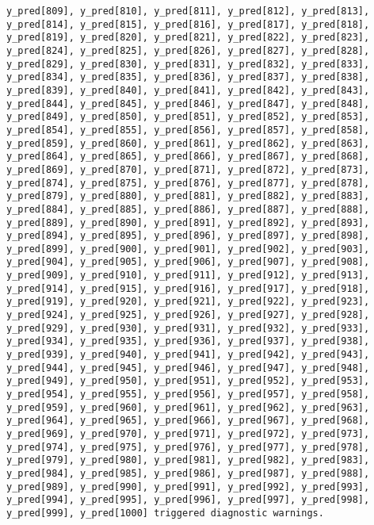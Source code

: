 \documentclass[
  letterpaper,
  DIV=11,
  numbers=noendperiod]{scrartcl}
\begin{document}
\begin{verbatim}
y_pred[809], y_pred[810], y_pred[811], y_pred[812], y_pred[813],
y_pred[814], y_pred[815], y_pred[816], y_pred[817], y_pred[818],
y_pred[819], y_pred[820], y_pred[821], y_pred[822], y_pred[823],
y_pred[824], y_pred[825], y_pred[826], y_pred[827], y_pred[828],
y_pred[829], y_pred[830], y_pred[831], y_pred[832], y_pred[833],
y_pred[834], y_pred[835], y_pred[836], y_pred[837], y_pred[838],
y_pred[839], y_pred[840], y_pred[841], y_pred[842], y_pred[843],
y_pred[844], y_pred[845], y_pred[846], y_pred[847], y_pred[848],
y_pred[849], y_pred[850], y_pred[851], y_pred[852], y_pred[853],
y_pred[854], y_pred[855], y_pred[856], y_pred[857], y_pred[858],
y_pred[859], y_pred[860], y_pred[861], y_pred[862], y_pred[863],
y_pred[864], y_pred[865], y_pred[866], y_pred[867], y_pred[868],
y_pred[869], y_pred[870], y_pred[871], y_pred[872], y_pred[873],
y_pred[874], y_pred[875], y_pred[876], y_pred[877], y_pred[878],
y_pred[879], y_pred[880], y_pred[881], y_pred[882], y_pred[883],
y_pred[884], y_pred[885], y_pred[886], y_pred[887], y_pred[888],
y_pred[889], y_pred[890], y_pred[891], y_pred[892], y_pred[893],
y_pred[894], y_pred[895], y_pred[896], y_pred[897], y_pred[898],
y_pred[899], y_pred[900], y_pred[901], y_pred[902], y_pred[903],
y_pred[904], y_pred[905], y_pred[906], y_pred[907], y_pred[908],
y_pred[909], y_pred[910], y_pred[911], y_pred[912], y_pred[913],
y_pred[914], y_pred[915], y_pred[916], y_pred[917], y_pred[918],
y_pred[919], y_pred[920], y_pred[921], y_pred[922], y_pred[923],
y_pred[924], y_pred[925], y_pred[926], y_pred[927], y_pred[928],
y_pred[929], y_pred[930], y_pred[931], y_pred[932], y_pred[933],
y_pred[934], y_pred[935], y_pred[936], y_pred[937], y_pred[938],
y_pred[939], y_pred[940], y_pred[941], y_pred[942], y_pred[943],
y_pred[944], y_pred[945], y_pred[946], y_pred[947], y_pred[948],
y_pred[949], y_pred[950], y_pred[951], y_pred[952], y_pred[953],
y_pred[954], y_pred[955], y_pred[956], y_pred[957], y_pred[958],
y_pred[959], y_pred[960], y_pred[961], y_pred[962], y_pred[963],
y_pred[964], y_pred[965], y_pred[966], y_pred[967], y_pred[968],
y_pred[969], y_pred[970], y_pred[971], y_pred[972], y_pred[973],
y_pred[974], y_pred[975], y_pred[976], y_pred[977], y_pred[978],
y_pred[979], y_pred[980], y_pred[981], y_pred[982], y_pred[983],
y_pred[984], y_pred[985], y_pred[986], y_pred[987], y_pred[988],
y_pred[989], y_pred[990], y_pred[991], y_pred[992], y_pred[993],
y_pred[994], y_pred[995], y_pred[996], y_pred[997], y_pred[998],
y_pred[999], y_pred[1000] triggered diagnostic warnings.


\end{verbatim}
\end{document}

